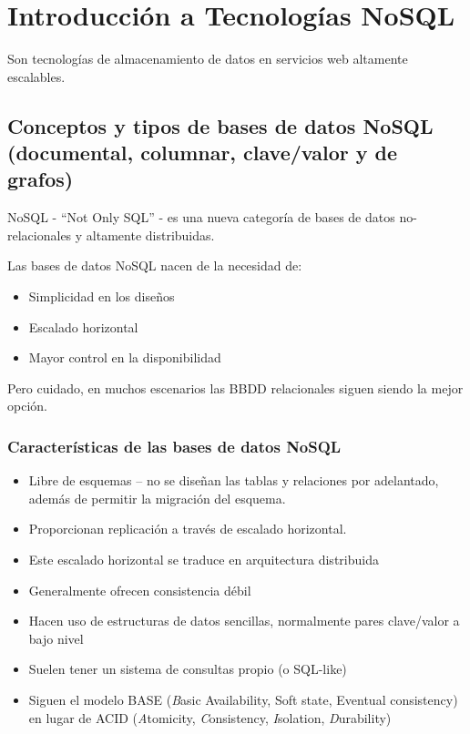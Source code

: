 \documentclass[
]{book}
\providecommand{\tightlist}{%
  \setlength{\itemsep}{0pt}\setlength{\parskip}{0pt}}
\begin{document}
\hypertarget{introducciuxf3n-a-tecnologuxedas-nosql}{%
\chapter{Introducción a Tecnologías NoSQL}\label{introducciuxf3n-a-tecnologuxedas-nosql}}

Son tecnologías de almacenamiento de datos en servicios web altamente escalables.

\hypertarget{conceptos-y-tipos-de-bases-de-datos-nosql-documental-columnar-clavevalor-y-de-grafos}{%
\section{Conceptos y tipos de bases de datos NoSQL (documental, columnar, clave/valor y de grafos)}\label{conceptos-y-tipos-de-bases-de-datos-nosql-documental-columnar-clavevalor-y-de-grafos}}

NoSQL - ``Not Only SQL'' - es una nueva categoría de bases de datos no-relacionales y altamente distribuidas.

Las bases de datos NoSQL nacen de la necesidad de:

\begin{itemize}
\item
  Simplicidad en los diseños
\item
  Escalado horizontal
\item
  Mayor control en la disponibilidad
\end{itemize}

Pero cuidado, en muchos escenarios las BBDD relacionales siguen siendo la mejor opción.

\hypertarget{caracteruxedsticas-de-las-bases-de-datos-nosql}{%
\subsection{Características de las bases de datos NoSQL}\label{caracteruxedsticas-de-las-bases-de-datos-nosql}}

\begin{itemize}
\tightlist
\item
  Libre de esquemas -- no se diseñan las tablas y relaciones por adelantado, además de permitir la migración del esquema.
\item
  Proporcionan replicación a través de escalado horizontal.
\item
  Este escalado horizontal se traduce en arquitectura distribuida
\item
  Generalmente ofrecen consistencia débil
\item
  Hacen uso de estructuras de datos sencillas, normalmente pares clave/valor a bajo nivel
\item
  Suelen tener un sistema de consultas propio (o SQL-like)
\item
  Siguen el modelo BASE (\emph{B}asic Availability, Soft state, Eventual consistency) en lugar de ACID (\emph{A}tomicity, \emph{C}onsistency, \emph{I}solation, \emph{D}urability)
\end{itemize}
\end{document}
